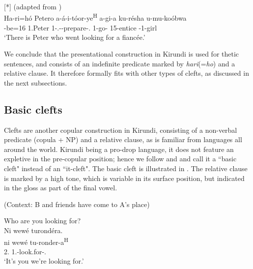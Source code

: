 \documentclass[output=paper]{langscibook}
\begin{document}
\z

\ea
[*]{
(adapted from )\\
\gll
Ha-ri=hó  Petero  a-á-i-tóor-ye\textsuperscript{H}   a-gi-a  ku-résha  u-mu-koóbwa \\
\EXP-{}be=16  1.Peter  1\SM-\RMT.\PST-\REFL-{}prepare-\PFV.\REL{}   1\SM-{}go-\FV{}  {}15-{}entice  \AUG{}-1-{}girl \\
\glt
  ‘There is Peter who went looking for a fiancée.’\\
}

\z

We conclude that the presentational construction in Kirundi is used for thetic sentences, and consists of an indefinite predicate marked by \textit{hari}(=\textit{ho}) and a relative clause. It therefore formally fits with other types of clefts, as discussed in the next subsections.

\subsection{Basic clefts}
\label{bkm:Ref81550959}
Clefts are another copular construction in Kirundi, consisting of a non-verbal predicate (copula + NP) and a relative clause, as is familiar from languages all around the world. Kirundi being a pro-drop language, it does not feature an expletive in the pre-copular position; hence we follow \citet{Nshemezimana2016} and \citet{LafkiouiEtAl2016} and call it a ``basic cleft" instead of an ``it-cleft". The basic cleft is illustrated in . The relative clause is marked by a high tone, which is variable in its surface position, but indicated in the gloss as part of the final vowel.

\ea
\label{bkm:Ref76915025}
(Context: B and friends have come to A’s place)
\begin{xlist}
  Who are you looking for?\\
Ni wewé turondéra.\\
\gll
ni  wewé  tu-ronder-a\textsuperscript{H}\\
\COP{}  2\SG.\PRO{}  1\PL.\SM{}-look.for-\FV.\REL{}\\
\glt
‘It’s you we’re looking for.’\\

\end{xlist}
\z
\end{document}
